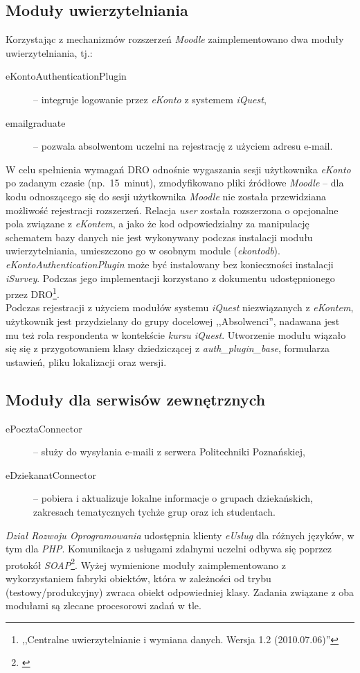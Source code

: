 \subsection{Moduły uwierzytelniania}
\label{Chapter662}

Korzystając z mechanizmów rozszerzeń \textit{Moodle} zaimplementowano dwa moduły uwierzytelniania, tj.:

\begin{description}
\item[eKontoAuthenticationPlugin] -- integruje logowanie przez \textit{eKonto} z systemem \textit{iQuest},
\item[emailgraduate] -- pozwala absolwentom uczelni na rejestrację z użyciem adresu e-mail.
\end{description}

W celu spełnienia wymagań DRO odnośnie wygaszania sesji użytkownika \textit{eKonto} po zadanym czasie (np.~15~minut), zmodyfikowano pliki źródłowe \textit{Moodle} -- dla kodu odnoszącego się do sesji użytkownika \textit{Moodle} nie została przewidziana możliwość rejestracji rozszerzeń. Relacja \textit{user} została rozszerzona o opcjonalne pola związane z \textit{eKontem}, a jako że kod odpowiedzialny za manipulację schematem bazy danych nie jest wykonywany podczas instalacji modułu uwierzytelniania, umieszczono go w osobnym module (\textit{ekontodb}). \textit{eKontoAuthenticationPlugin} może być instalowany bez konieczności instalacji \textit{iSurvey}. Podczas jego implementacji korzystano z dokumentu udostępnionego przez DRO\footnote{,,Centralne uwierzytelnianie i wymiana danych. Wersja 1.2 (2010.07.06)''\cite{PP:CUiWD10}}. \\

Podczas rejestracji z użyciem modułów systemu \textit{iQuest} niezwiązanych z \textit{eKontem}, użytkownik jest przydzielany do grupy docelowej ,,Absolwenci'', nadawana jest mu też rola respondenta w kontekście \textit{kursu iQuest}. Utworzenie modułu wiązało się się z przygotowaniem klasy dziedziczącej z \textit{auth\_plugin\_base}, formularza ustawień, pliku lokalizacji oraz wersji.

\subsection{Moduły dla serwisów zewnętrznych}
\begin{description}
\item[ePocztaConnector] -- służy do wysyłania e-maili z serwera Politechniki Poznańskiej,
\item[eDziekanatConnector] -- pobiera i aktualizuje lokalne informacje o grupach dziekańskich, zakresach tematycznych tychże grup oraz ich studentach.
\end{description}

\textit{Dział Rozwoju Oprogramowania} udostępnia klienty \textit{eUsług} dla różnych języków, w tym dla \emph{PHP}. Komunikacja z usługami zdalnymi uczelni odbywa się poprzez protokół \textit{SOAP}\footnote{\cite{W3C:SOAP07}}. Wyżej wymienione moduły zaimplementowano z wykorzystaniem fabryki obiektów, która w zależności od trybu (testowy\slash produkcyjny) zwraca obiekt odpowiedniej klasy. Zadania związane z oba modułami są zlecane procesorowi zadań w tle.